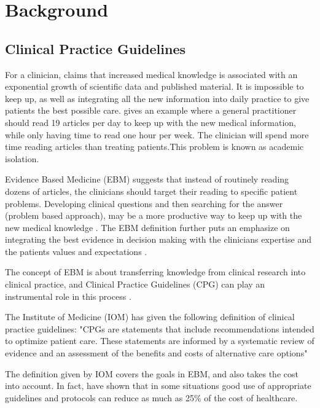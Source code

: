\chapter{Background}
\section{Clinical Practice Guidelines}
For a clinician, \textcite{Fervers2010} claims that increased medical knowledge is associated with an exponential growth of scientific data and published material. It is impossible to keep up, as well as integrating all the new information into daily practice to give patients the best possible care.  \textcite{Masic2008} gives an example where a general practitioner should read 19 articles per day to keep up with the new medical information, while only having time to read one hour per week. The clinician will spend more time reading articles than treating patients.This problem is known as academic isolation.

Evidence Based Medicine (EBM) suggests that instead of routinely reading dozens of articles, the clinicians should target their reading to specific patient problems. Developing clinical questions and then searching for the answer (problem based approach), may be a more productive way to keep up with the new medical knowledge \parencite{Masic2008}. The EBM definition further puts an emphasize on integrating the best evidence in decision making with the clinicians expertise and the patients values and expectations \parencite{Masic2008}. 

The concept of EBM is about transferring knowledge from clinical research into clinical practice, and Clinical Practice Guidelines (CPG) can play an instrumental role in this process \parencite{Fervers2010}.

The Institute of Medicine (IOM) has given the following definition of clinical practice guidelines: "CPGs are statements that include recommendations intended to optimize patient care. These statements are informed by a systematic review of evidence and an assessment of the benefits and costs of alternative care options" \parencite{Guidelines2011}

The definition given by IOM covers the goals in EBM, and also takes the cost into account. In fact, \textcite{Clayton1995} have shown that in some situations good use of appropriate guidelines and protocols can reduce as much as 25\% of the cost of healthcare.

